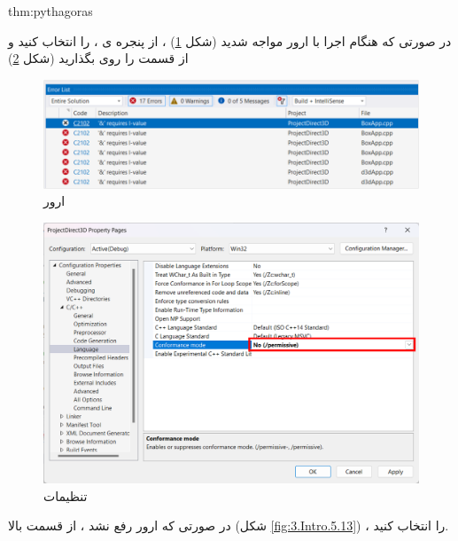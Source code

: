 \begin{theo}{thm:pythagoras}
{
    \Large
    \begin{spacing}{1.5}
        در صورتی که هنگام اجرا با ارور  مواجه شدید (شکل \ref{fig:3.Intro.5.11}) ،
        از پنجره ی  ،   را انتخاب کنید و از قسمت  را روی  بگذارید (شکل \ref{fig:3.Intro.5.12})

        \begin{figure}[H]
            \centering
            \setlength{\belowcaptionskip}{-10pt}
            \includegraphics[width=\textwidth]{Images/3/3.Intro.5.11}
            \caption{ارور }
            \label{fig:3.Intro.5.11}
        \end{figure}

        \begin{figure}[H]
            \centering
            \setlength{\belowcaptionskip}{-10pt}
            \includegraphics[width=\textwidth]{Images/3/3.Intro.5.12}
            \caption{تنظیمات }
            \label{fig:3.Intro.5.12}
        \end{figure}

        در صورتی که ارور رفع نشد ، از قسمت بالا (شکل \ref{fig:3.Intro.5.13}) ،  را انتخاب کنید.


\end{spacing}}
\end{theo}

